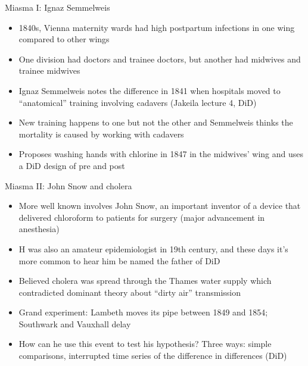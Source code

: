 \documentclass{beamer}
\begin{document}
\begin{frame}{Miasma I: Ignaz Semmelweis}

\begin{itemize}
\item 1840s, Vienna maternity wards had high postpartum infections in one wing compared to other wings
\item One division had doctors and trainee doctors, but another had midwives and trainee midwives
\item Ignaz Semmelweis notes the difference in 1841 when hospitals moved to ``anatomical'' training involving cadavers (Jakeila lecture 4, DiD)
\item New training happens to one but not the other and Semmelweis thinks the mortality is caused by working with cadavers
\item Proposes washing hands with chlorine in 1847 in the midwives' wing and uses a DiD design of pre and post
\end{itemize}

\end{frame}



\begin{frame}{Miasma II: John Snow and cholera}

\begin{itemize}
\item More well known involves John Snow, an important inventor of a device that delivered chloroform to patients for surgery (major advancement in anesthesia)
\item H was also an amateur epidemiologist in 19th century, and these days it's more common to hear him be named the father of DiD
\item Believed cholera was spread through the Thames water supply which contradicted dominant theory about ``dirty air'' transmission
\item Grand experiment: Lambeth moves its pipe between 1849 and 1854; Southwark and Vauxhall delay
\item How can he use this event to test his hypothesis? Three ways: simple comparisons, interrupted time series of the difference in differences (DiD)
\end{itemize}

\end{frame}
\end{document}
